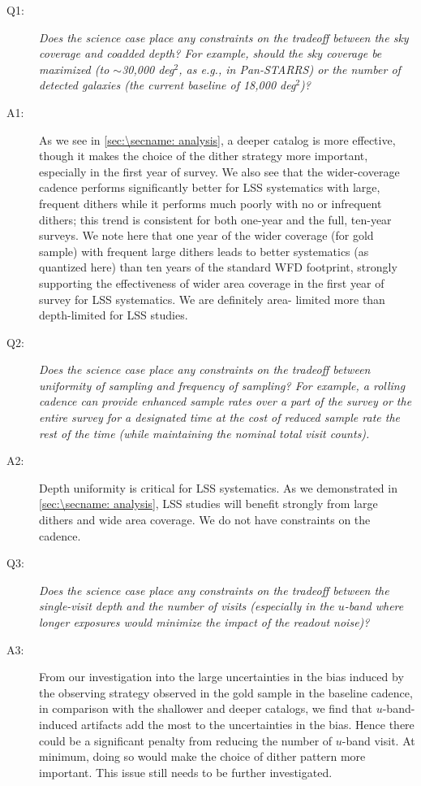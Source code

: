 \begin{description}

\item[Q1:] {\it Does the science case place any constraints on the
tradeoff between the sky coverage and coadded depth? For example, should
the sky coverage be maximized (to $\sim$30,000 deg$^2$, as e.g., in
Pan-STARRS) or the number of detected galaxies (the current baseline
of 18,000 deg$^2$)?}

\item[A1:] As we see in \autoref{sec:\secname: analysis}, a deeper
catalog is more effective, though it makes the choice of the dither
strategy more important, especially in the first year of survey. We also see
that the wider-coverage cadence  performs
significantly better for LSS systematics with large, frequent dithers
while it performs much poorly with no or infrequent dithers; this
trend is consistent for both one-year and the full, ten-year surveys. We
note here that one year of the wider coverage (for gold sample) with frequent large
dithers leads to better systematics (as quantized here) than ten years of
the standard WFD  footprint, strongly supporting the effectiveness of wider area
coverage in the first year of survey for LSS systematics. We are definitely area-
limited more than depth-limited for LSS studies.

\item[Q2:] {\it Does the science case place any constraints on the
tradeoff between uniformity of sampling and frequency of  sampling? For
example, a rolling cadence can provide enhanced sample rates over a part
of the survey or the entire survey for a designated time at the cost of
reduced sample rate the rest of the time (while maintaining the nominal
total visit counts).}

\item[A2:] Depth uniformity is critical for LSS systematics. As we
demonstrated in \autoref{sec:\secname: analysis}, LSS studies will benefit
strongly from large dithers and wide area coverage. We do not have constraints
on the cadence.

\item[Q3:] {\it Does the science case place any constraints on the
tradeoff between the single-visit depth and the number of visits
(especially in the $u$-band where longer exposures would minimize the
impact of the readout noise)?}

\item[A3:] From our investigation into the large uncertainties in the bias induced by
the observing strategy observed in the gold sample in the baseline cadence, in
comparison with the shallower and deeper catalogs, we find that
$u$-band-induced artifacts add the most to the uncertainties in the
bias. Hence there could be a significant penalty from reducing the
number of $u$-band visit. At minimum, doing so would make the choice of
dither pattern more important. This issue still needs to be further
investigated.


\end{description}
